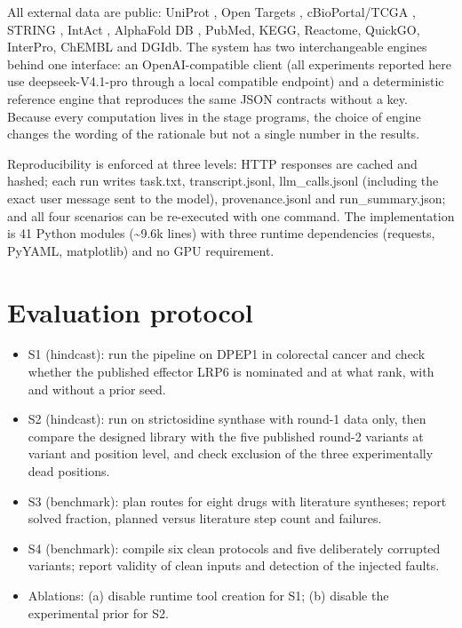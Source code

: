 All external data are public: UniProt \cite{r08}, Open Targets \cite{r09}, cBioPortal/TCGA \cite{r10}, STRING \cite{r11}, IntAct \cite{r12}, AlphaFold DB \cite{r13}, PubMed, KEGG, Reactome, QuickGO, InterPro, ChEMBL and DGIdb. The system has two interchangeable engines behind one interface: an OpenAI-compatible client (all experiments reported here use deepseek-V4.1-pro through a local compatible endpoint) and a deterministic reference engine that reproduces the same JSON contracts without a key. Because every computation lives in the stage programs, the choice of engine changes the wording of the rationale but not a single number in the results.

Reproducibility is enforced at three levels: HTTP responses are cached and hashed; each run writes task.txt, transcript.jsonl, llm\_calls.jsonl (including the exact user message sent to the model), provenance.jsonl and run\_summary.json; and all four scenarios can be re-executed with one command. The implementation is 41 Python modules (\textasciitilde{}9.6k lines) with three runtime dependencies (requests, PyYAML, matplotlib) and no GPU requirement.

\section{Evaluation protocol}

\begin{itemize}
\setlength{\itemsep}{0pt}\setlength{\parskip}{0pt}
\item S1 (hindcast): run the pipeline on DPEP1 in colorectal cancer and check whether the published effector LRP6 is nominated and at what rank, with and without a prior seed.
\item S2 (hindcast): run on stric\-to\-si\-dine synthase with round-1 data only, then compare the designed library with the five published round-2 variants at variant and position level, and check exclusion of the three experimentally dead positions.
\item S3 (benchmark): plan routes for eight drugs with literature syntheses; report solved fraction, planned versus literature step count and failures.
\item S4 (benchmark): compile six clean protocols and five deliberately corrupted variants; report validity of clean inputs and detection of the injected faults.
\item Ablations: (a) disable runtime tool creation for S1; (b) disable the experimental prior for S2.
\end{itemize}

